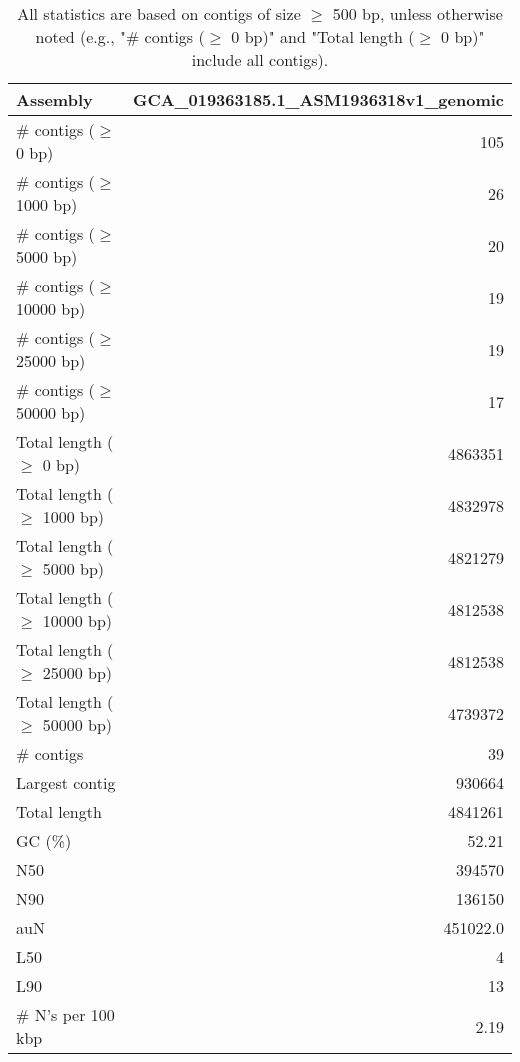 \documentclass[12pt,a4paper]{article}
\begin{document}
\begin{table}[ht]
\begin{center}
\caption{All statistics are based on contigs of size $\geq$ 500 bp, unless otherwise noted (e.g., "\# contigs ($\geq$ 0 bp)" and "Total length ($\geq$ 0 bp)" include all contigs).}
\begin{tabular}{|l*{1}{|r}|}
\hline
Assembly & GCA\_019363185.1\_ASM1936318v1\_genomic \\ \hline
\# contigs ($\geq$ 0 bp) & 105 \\ \hline
\# contigs ($\geq$ 1000 bp) & 26 \\ \hline
\# contigs ($\geq$ 5000 bp) & 20 \\ \hline
\# contigs ($\geq$ 10000 bp) & 19 \\ \hline
\# contigs ($\geq$ 25000 bp) & 19 \\ \hline
\# contigs ($\geq$ 50000 bp) & 17 \\ \hline
Total length ($\geq$ 0 bp) & 4863351 \\ \hline
Total length ($\geq$ 1000 bp) & 4832978 \\ \hline
Total length ($\geq$ 5000 bp) & 4821279 \\ \hline
Total length ($\geq$ 10000 bp) & 4812538 \\ \hline
Total length ($\geq$ 25000 bp) & 4812538 \\ \hline
Total length ($\geq$ 50000 bp) & 4739372 \\ \hline
\# contigs & 39 \\ \hline
Largest contig & 930664 \\ \hline
Total length & 4841261 \\ \hline
GC (\%) & 52.21 \\ \hline
N50 & 394570 \\ \hline
N90 & 136150 \\ \hline
auN & 451022.0 \\ \hline
L50 & 4 \\ \hline
L90 & 13 \\ \hline
\# N's per 100 kbp & 2.19 \\ \hline
\end{tabular}
\end{center}
\end{table}
\end{document}
